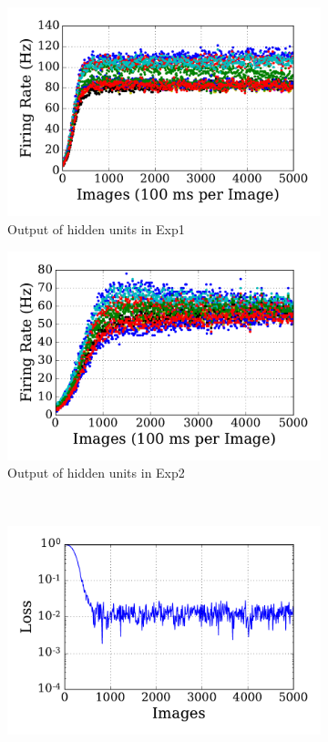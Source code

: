 \begin{figure}
\begin{subfigure}[t]{0.48\textwidth}
		\includegraphics[width=\textwidth]{pics_sdlm/07_exp_SAE_all_long/exp1_hid_s.pdf}
		\caption{Output of hidden units in Exp1}
	\end{subfigure}
	\begin{subfigure}[t]{0.48\textwidth}
		\includegraphics[width=\textwidth]{pics_sdlm/07_exp_SAE_all_long/exp2_hid_s.pdf}
		\caption{Output of hidden units in Exp2}
	\end{subfigure}\\
	\begin{subfigure}[t]{0.48\textwidth}
		\includegraphics[width=\textwidth]{pics_sdlm/07_exp_SAE_all_long/exp1_mse_nons.pdf}

\end{subfigure}
\end{figure}

